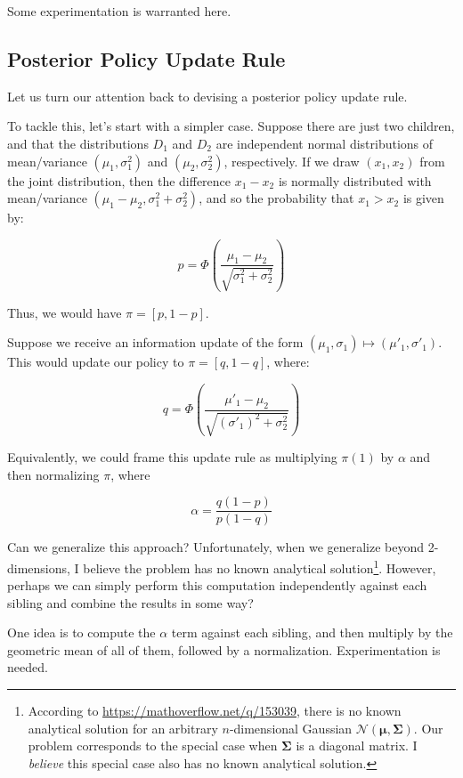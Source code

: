 \documentclass[tikz]{article}
\begin{document}
Some experimentation is warranted here. 

\subsection{Posterior Policy Update Rule}

Let us turn our attention back to devising a posterior policy update rule. \newline

To tackle this, let's start with a simpler case. Suppose there are just two children, and that the 
distributions $D_1$ and $D_2$ are independent normal distributions of mean/variance $(\mu_1, \sigma_1^2)$ and $(\mu_2, \sigma_2^2)$, respectively.
If we draw $(x_1, x_2)$ from the
joint distribution, then the difference $x_1 - x_2$ is normally distributed with mean/variance $(\mu_1 - \mu_2, \sigma_1^2 + \sigma_2^2)$,
and so the probability that $x_1 > x_2$ is given by:

$$
p = \Phi\left(\frac{\mu_1 - \mu_2}{\sqrt{\sigma_1^2 + \sigma_2^2}}\right)
$$

Thus, we would have $\pi = [p, 1-p]$. \newline

Suppose we receive an information update of the form $(\mu_1, \sigma_1) \mapsto (\mu'_1, \sigma'_1)$.
This would update our policy to $\pi = [q, 1-q]$, where:

$$
q = \Phi\left(\frac{\mu'_1 - \mu_2}{\sqrt{(\sigma'_1)^2 + \sigma_2^2}}\right)
$$

Equivalently, we could frame this update rule as multiplying $\pi(1)$ by $\alpha$ and then normalizing $\pi$, where

$$
\alpha = \frac{q(1-p)}{p(1-q)}
$$

Can we generalize this approach? Unfortunately, when we generalize beyond 2-dimensions, I believe the problem has no known
analytical solution\footnote{According to \url{https://mathoverflow.net/q/153039}, there is no known analytical solution for an arbitrary $n$-dimensional
Gaussian $\mathcal{N}(\boldsymbol{\mu},\boldsymbol{\Sigma})$. Our problem corresponds to the special case when $\boldsymbol{\Sigma}$ is a diagonal matrix. I \emph{believe}
this special case also has no known analytical solution.}. However, perhaps we can simply perform this computation
independently against each sibling and combine the results in some way? \newline

One idea is to compute the $\alpha$ term against each sibling, and then multiply by the geometric mean of all of them, followed by a normalization.
Experimentation is needed. \newline
\end{document}
